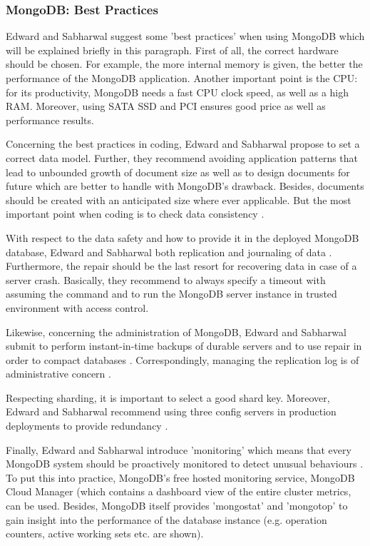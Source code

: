 \subsubsection{MongoDB: Best Practices}

Edward and Sabharwal suggest some 'best practices' when using MongoDB \cite[p.234 ff.]{mongodb_edward} which will be explained briefly in this paragraph. 
First of all, the correct hardware should be chosen. For example, the more internal memory is given, the better the performance of the MongoDB application. Another important point is the CPU: for its productivity, MongoDB needs a fast \ac{CPU} clock speed, as well as a high \ac{RAM}. Moreover, using SATA SSD and \ac{PCI} ensures good price as well as performance results.

Concerning the best practices in coding, Edward and Sabharwal propose to set a correct data model. Further, they recommend avoiding application patterns that lead to unbounded growth of document size as well as to design documents for future which are better to handle with MongoDB's drawback. Besides, documents should be created with an anticipated size where ever applicable. But the most important point when coding is to check data consistency \cite[p.234 ff.]{mongodb_edward}. 

With respect to the data safety and how to provide it in the deployed MongoDB database, Edward and Sabharwal both replication and journaling of data \cite[p.234 ff.]{mongodb_edward}. Furthermore, the repair should be the last resort for recovering data in case of a server crash. Basically, they recommend to always specify a timeout with assuming the command and to run the MongoDB server instance in trusted environment with access control.

Likewise, concerning the administration of MongoDB, Edward and Sabharwal submit to perform instant-in-time backups of durable servers and to use repair in order to compact databases \cite[p.234 ff.]{mongodb_edward}. Correspondingly, managing the replication log is of administrative concern \cite[p.240 ff.]{mongodb_edward}. 

Respecting sharding, it is important to select a good shard key. Moreover, Edward and Sabharwal recommend using three config servers in production deployments to provide redundancy \cite[p.240 ff.]{mongodb_edward}. 

Finally, Edward and Sabharwal introduce 'monitoring' which means that every MongoDB system should be proactively monitored to detect unusual behaviours \cite[p.240 ff.]{mongodb_edward}. To put this into practice, MongoDB's free hosted monitoring service, MongoDB Cloud Manager (which contains a dashboard view of the entire cluster metrics, can be used. Besides, MongoDB itself provides 'mongostat' and 'mongotop' to gain insight into the performance of the database instance (e.g. operation counters, active working sets etc. are shown). 

